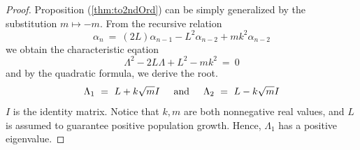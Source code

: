 \documentclass{article}
\newcommand{\textAnd}{
    {
        \hspace{5mm}
        \textrm{and}
        \hspace{5mm}
    }
}
\numberwithin{equation}{section}
\begin{document}
\begin{proof}
    Proposition (\ref{thm:to2ndOrd}) can be simply generalized by 
    the substitution \newline $m \mapsto -m$. From the recursive relation 
    \begin{equation}
        \alpha_n \ = \ (2L)\alpha_{n - 1} -L^2 \alpha_{n - 2} + mk^2 \alpha_{n - 2}
    \end{equation}
    we obtain the characteristic eqation 
    \begin{equation}
    \Lambda ^2 - 2L \Lambda + L^2 - mk^2 \ =\ 0
    \end{equation}
    and by the quadratic formula, we derive the root. 
    \begin{equation}
        \Lambda_1 \ = \ L + k\sqrt{m} I \textAnd \Lambda_2\ = \ L - k\sqrt{m} I
    \end{equation}
    $I$ is the identity matrix. 
    Notice that $k, m$ are both nonnegative real values, and $L$ 
    is assumed to guarantee positive population growth. Hence, 
    $\Lambda_1$ has a positive eigenvalue. 


\end{proof}
\end{document}
